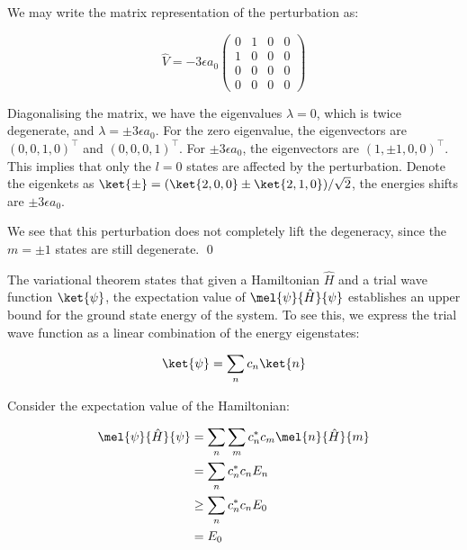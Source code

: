 \documentclass[12pt]{article}
\begin{document}
We may write the matrix representation of the perturbation as:

\begin{equation}
    \hat{V} = -3 \epsilon a_{0}
    \begin{pmatrix}
        0 & 1 & 0 & 0 \\
        1 & 0 & 0 & 0 \\
        0 & 0 & 0 & 0 \\
        0 & 0 & 0 & 0
    \end{pmatrix}
\end{equation}

Diagonalising the matrix, we have the eigenvalues $\lambda = 0$, which is twice degenerate, and $\lambda = \pm 3 \epsilon a_{0}$. For the zero eigenvalue, the eigenvectors are $(0, 0, 1, 0)^{\intercal}$ and $(0, 0, 0, 1)^{\intercal}$. For $\pm 3 \epsilon a_{0}$, the eigenvectors are $(1, \pm 1, 0, 0)^{\intercal}$. This implies that only the $l = 0$ states are affected by the perturbation. Denote the eigenkets as $\ket{\pm} = (\ket{2,0,0} \pm \ket{2,1,0})/\sqrt{2}$, the energies shifts are $\pm 3 \epsilon a_{0}$.

We see that this perturbation does not completely lift the degeneracy, since the $m = \pm 1$ states are still degenerate.
\qed


The variational theorem states that given a Hamiltonian $\hat{H}$ and a trial wave function $\ket{\psi}$, the expectation value of $\mel{\psi}{\hat{H}}{\psi}$ establishes an upper bound for the ground state energy of the system. To see this, we express the trial wave function as a linear combination of the energy eigenstates:

\begin{equation}
    \ket{\psi} = \sum_{n} c_{n} \ket{n}
\end{equation}

Consider the expectation value of the Hamiltonian:

\begin{equation}
    \begin{split}
        \mel{\psi}{\hat{H}}{\psi} &= \sum_{n} \sum_{m} c_{n}^{*} c_{m} \mel{n}{\hat{H}}{m} \\
        &= \sum_{n} c_{n}^{*} c_{n} E_{n} \\
        &\geq \sum_{n} c_{n}^{*} c_{n} E_{0} \\
        &= E_{0}
    \end{split}
\end{equation}
\end{document}
